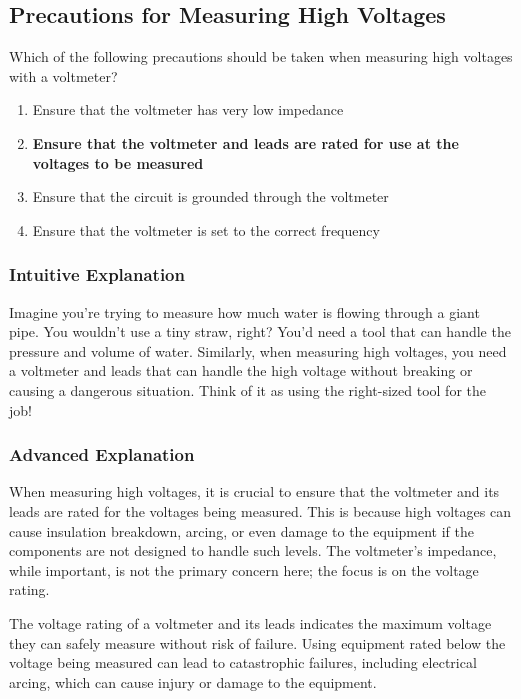 \subsection{Precautions for Measuring High Voltages}
\label{T0A12}

\begin{tcolorbox}[colback=gray!10!white,colframe=black!75!black,title=T0A12]
Which of the following precautions should be taken when measuring high voltages with a voltmeter?
\begin{enumerate}[label=\Alph*]
    \item Ensure that the voltmeter has very low impedance
    \item \textbf{Ensure that the voltmeter and leads are rated for use at the voltages to be measured}
    \item Ensure that the circuit is grounded through the voltmeter
    \item Ensure that the voltmeter is set to the correct frequency
\end{enumerate}
\end{tcolorbox}

\subsubsection{Intuitive Explanation}
Imagine you're trying to measure how much water is flowing through a giant pipe. You wouldn't use a tiny straw, right? You'd need a tool that can handle the pressure and volume of water. Similarly, when measuring high voltages, you need a voltmeter and leads that can handle the high voltage without breaking or causing a dangerous situation. Think of it as using the right-sized tool for the job!

\subsubsection{Advanced Explanation}
When measuring high voltages, it is crucial to ensure that the voltmeter and its leads are rated for the voltages being measured. This is because high voltages can cause insulation breakdown, arcing, or even damage to the equipment if the components are not designed to handle such levels. The voltmeter's impedance, while important, is not the primary concern here; the focus is on the voltage rating. 

The voltage rating of a voltmeter and its leads indicates the maximum voltage they can safely measure without risk of failure. Using equipment rated below the voltage being measured can lead to catastrophic failures, including electrical arcing, which can cause injury or damage to the equipment. 

